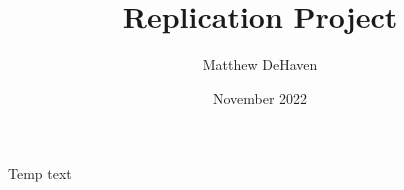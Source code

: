 \documentclass{article}
\title{Replication Project}
\author{Matthew DeHaven}
\date{November 2022}
\begin{document}
\maketitle

Temp text
\end{document}
